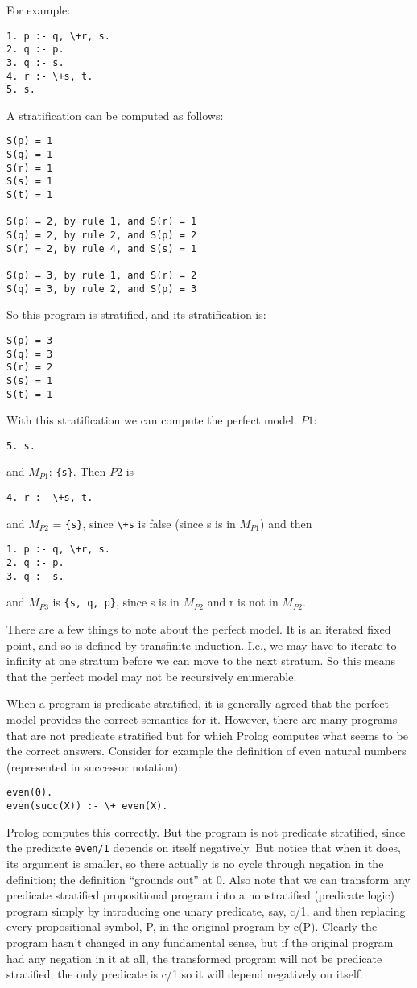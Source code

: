 For example:
\begin{verbatim}
1. p :- q, \+r, s.
2. q :- p.
3. q :- s.
4. r :- \+s, t.
5. s.
\end{verbatim}
A stratification can be computed as follows:
\begin{verbatim}
S(p) = 1
S(q) = 1
S(r) = 1
S(s) = 1
S(t) = 1

S(p) = 2, by rule 1, and S(r) = 1
S(q) = 2, by rule 2, and S(p) = 2
S(r) = 2, by rule 4, and S(s) = 1

S(p) = 3, by rule 1, and S(r) = 2
S(q) = 3, by rule 2, and S(p) = 3
\end{verbatim}
So this program is stratified, and its stratification is:
\begin{verbatim}
S(p) = 3
S(q) = 3
S(r) = 2
S(s) = 1
S(t) = 1
\end{verbatim}
With this stratification we can compute the perfect model.
${P1}$:
\begin{verbatim}
5. s.
\end{verbatim}
and $M_{P1}$: \verb|{s}|.  Then ${P2}$ is
\begin{verbatim}
4. r :- \+s, t.
\end{verbatim}
and $M_{P2}$ = \verb|{s}|, since \verb|\+s| is false (since s is in $M_{P1}$)
and then %
\begin{verbatim}
1. p :- q, \+r, s.
2. q :- p.
3. q :- s.
\end{verbatim}
and $M_{P3}$ is \verb|{s, q, p}|, since s is in $M_{P2}$ and r is not in
$M_{P2}$. 

There are a few things to note about the perfect model.  It is an
iterated fixed point, and so is defined by transfinite induction.
I.e., we may have to iterate to infinity at one stratum before we can
move to the next stratum.  So this means that the perfect model may
not be recursively enumerable.  

When a program is predicate stratified, it is generally agreed that
the perfect model provides the correct semantics for it.  However,
there are many programs that are not predicate stratified but for
which Prolog computes what seems to be the correct answers.  Consider
for example the definition of even natural numbers (represented in
successor notation):
\begin{verbatim}
even(0).
even(succ(X)) :- \+ even(X).
\end{verbatim}
Prolog computes this correctly.  But the program is not predicate
stratified, since the predicate \verb|even/1| depends on itself
negatively.  But notice that when it does, its argument is smaller, so
there actually is no cycle through negation in the definition; the
definition ``grounds out'' at 0.  Also note that we can transform any
predicate stratified propositional program into a nonstratified
(predicate logic) program simply by introducing one unary predicate,
say, c/1, and then replacing every propositional symbol, P, in the
original program by c(P).  Clearly the program hasn't changed in any
fundamental sense, but if the original program had any negation in it
at all, the transformed program will not be predicate stratified; the
only predicate is c/1 so it will depend negatively on itself. 

